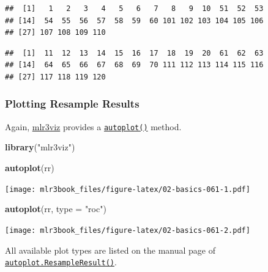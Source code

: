 \documentclass[]{article}
\newenvironment{Shaded}{\begin{snugshade}}{\end{snugshade}}
\newcommand{\DataTypeTok}[1]{\textcolor[rgb]{0.13,0.29,0.53}{#1}}
\newcommand{\DecValTok}[1]{\textcolor[rgb]{0.00,0.00,0.81}{#1}}
\newcommand{\KeywordTok}[1]{\textcolor[rgb]{0.13,0.29,0.53}{\textbf{#1}}}
\newcommand{\NormalTok}[1]{#1}
\newcommand{\OperatorTok}[1]{\textcolor[rgb]{0.81,0.36,0.00}{\textbf{#1}}}
\newcommand{\StringTok}[1]{\textcolor[rgb]{0.31,0.60,0.02}{#1}}
\renewenvironment{Shaded} {\begin{snugshade}\small} {\end{snugshade}}
\begin{document}
\begin{verbatim}
##  [1]   1   2   3   4   5   6   7   8   9  10  51  52  53
## [14]  54  55  56  57  58  59  60 101 102 103 104 105 106
## [27] 107 108 109 110
\end{verbatim}

\begin{Shaded}
\end{Shaded}

\begin{verbatim}
##  [1]  11  12  13  14  15  16  17  18  19  20  61  62  63
## [14]  64  65  66  67  68  69  70 111 112 113 114 115 116
## [27] 117 118 119 120
\end{verbatim}

\hypertarget{autoplot-resampleresult}{%
\subsubsection{Plotting Resample Results}\label{autoplot-resampleresult}}

Again, \href{https://mlr3viz.mlr-org.com}{mlr3viz} provides a \href{https://www.rdocumentation.org/packages/ggplot2/topics/autoplot}{\texttt{autoplot()}} method.

\begin{Shaded}
\begin{Highlighting}[]
\KeywordTok{library}\NormalTok{(}\StringTok{"mlr3viz"}\NormalTok{)}

\KeywordTok{autoplot}\NormalTok{(rr)}
\end{Highlighting}
\end{Shaded}

\texttt{[image: mlr3book\_files/figure-latex/02-basics-061-1.pdf]}

\begin{Shaded}
\begin{Highlighting}[]
\KeywordTok{autoplot}\NormalTok{(rr, }\DataTypeTok{type =} \StringTok{"roc"}\NormalTok{)}
\end{Highlighting}
\end{Shaded}

\texttt{[image: mlr3book\_files/figure-latex/02-basics-061-2.pdf]}

All available plot types are listed on the manual page of \href{https://mlr3viz.mlr-org.com/reference/autoplot.ResampleResult.html}{\texttt{autoplot.ResampleResult()}}.
\end{document}
